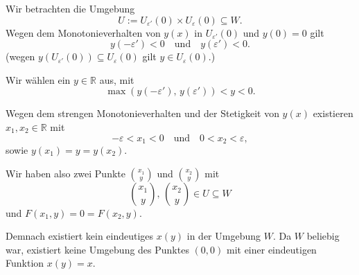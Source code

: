\documentclass[a4paper,12pt]{article}
\begin{document}
\begin{enumerate}[label=\alph*)]
    Wir betrachten die Umgebung
    \[
        U := U_{\varepsilon'}(0) \times U_\varepsilon(0) \subseteq W.
    \]
    Wegen dem Monotonieverhalten von $y(x)$ in $U_{\varepsilon'}(0)$ und $y(0) = 0$ gilt
    \[
        y(-\varepsilon') < 0 \quad \text{und} \quad y(\varepsilon') < 0.
    \]
    (wegen $y(U_{\varepsilon'}(0)) \subseteq U_\varepsilon(0)$ gilt $y \in U_\varepsilon(0)$.)

    Wir wählen ein $y \in \mathbb{R}$ aus, mit
    \[
        \max(y(-\varepsilon'),\, y(\varepsilon')) < y < 0.
    \]

    Wegen dem strengen Monotonieverhalten und der Stetigkeit von $y(x)$ existieren $x_1, x_2 \in \mathbb{R}$ mit
    \[
        -\varepsilon < x_1 < 0 \quad \text{und} \quad 0 < x_2 < \varepsilon,
    \]
    sowie $y(x_1) = y = y(x_2)$.

    Wir haben also zwei Punkte $\binom{x_1}{y}$ und $\binom{x_2}{y}$ mit
    \[
        \binom{x_1}{y},\, \binom{x_2}{y} \in U \subseteq W
    \]
    und $F(x_1, y) = 0 = F(x_2, y)$.

    Demnach existiert kein eindeutiges $x(y)$ in der Umgebung $W$. Da $W$ beliebig war, existiert keine Umgebung des Punktes $(0,0)$ mit einer eindeutigen Funktion $x(y) = x$.

\end{enumerate}
\end{document}
